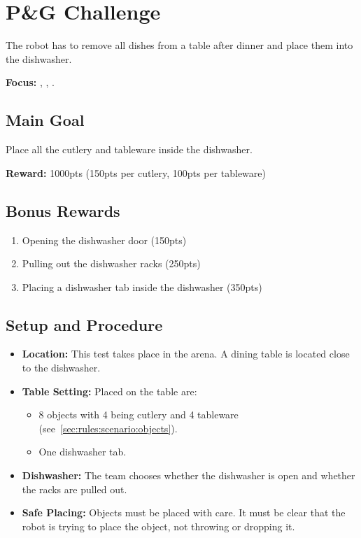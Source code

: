 \section{P\&G Challenge}
\label{test:clean-the-table}
The robot has to remove all dishes from a table after dinner and place them into the dishwasher.

\noindent \textbf{Focus:} \SysI, \MAN{} \CV{}, \OR{}.

\subsection*{Main Goal}
Place all the cutlery and tableware inside the dishwasher.

\noindent\textbf{Reward:} 1000pts (150pts per cutlery, 100pts per tableware)

\subsection*{Bonus Rewards}
\begin{enumerate}[nosep]
	\item Opening the dishwasher door (150pts)
	\item Pulling out the dishwasher racks (250pts)
	\item Placing a dishwasher tab inside the dishwasher (350pts)
\end{enumerate}

\subsection*{Setup and Procedure}
\begin{itemize}[nosep]
	\item \textbf{Location:} This test takes place in the arena. A dining table is located close to the dishwasher.
	
	\item \textbf{Table Setting:} Placed on the table are: 
	\begin{itemize}[nosep]
		\item 8 objects with 4 being cutlery and 4 tableware (see~\ref{sec:rules:scenario:objects}).
		\item One dishwasher tab.
	\end{itemize}
	
	\item \textbf{Dishwasher:} The team chooses whether the dishwasher is open and whether the racks are pulled out.
	
	\item \textbf{Safe Placing:} Objects must be placed with care. It must be clear that the robot is trying to place the object, not throwing or dropping it.
\end{itemize}


